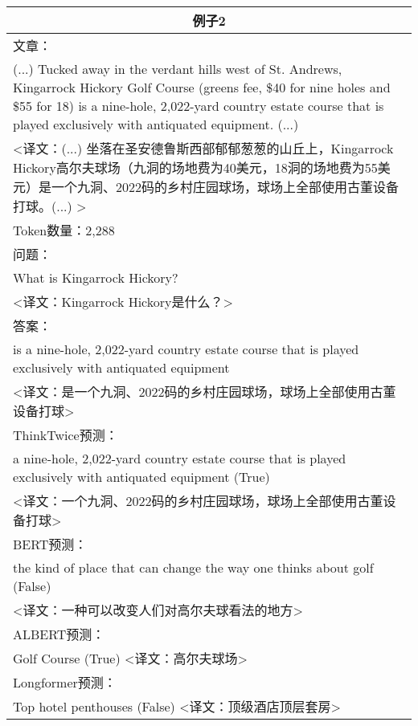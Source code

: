 \begin{table}[htbp]
\begin{tabular}{p{408pt}}
        \multicolumn{1}{c}{\bfseries 例子2} \\
        \hline
        文章：\\
        (...) Tucked away in the verdant hills west of St. Andrews, Kingarrock Hickory Golf Course (greens fee, \$40 for nine holes and \$55 for 18) \textcolor[rgb]{1,0,0.2}{is a nine-hole, 2,022-yard country estate course that is played exclusively with antiquated equipment}. (...) \\
        <译文：(...) 坐落在圣安德鲁斯西部郁郁葱葱的山丘上，Kingarrock Hickory高尔夫球场（九洞的场地费为40美元，18洞的场地费为55美元）是一个九洞、2022码的乡村庄园球场，球场上全部使用古董设备打球。(...) > \\
        \hline
        Token数量：2,288 \\
        \hline
        问题：\\
        What is Kingarrock Hickory? \\
        <译文：Kingarrock Hickory是什么？> \\
        \hline
        答案：\\
        is a nine-hole, 2,022-yard country estate course that is played exclusively with antiquated equipment \\
        <译文：是一个九洞、2022码的乡村庄园球场，球场上全部使用古董设备打球> \\
        \hline
        ThinkTwice预测：\\
        \textcolor[rgb]{1,0,0.2}{a nine-hole, 2,022-yard country estate course that is played exclusively with antiquated equipment} (True) \\
        <译文：一个九洞、2022码的乡村庄园球场，球场上全部使用古董设备打球> \\
        \hline
        BERT预测：\\
        the kind of place that can change the way one thinks about golf (False) \\
        <译文：一种可以改变人们对高尔夫球看法的地方> \\
        \hline
        ALBERT预测：\\
        Golf Course (True)
        <译文：高尔夫球场> \\
        \hline
        Longformer预测： \\
        Top hotel penthouses (False)
        <译文：顶级酒店顶层套房> \\
        \hline
    \end{tabular}
    \label{tab:3-2}
\end{table}
